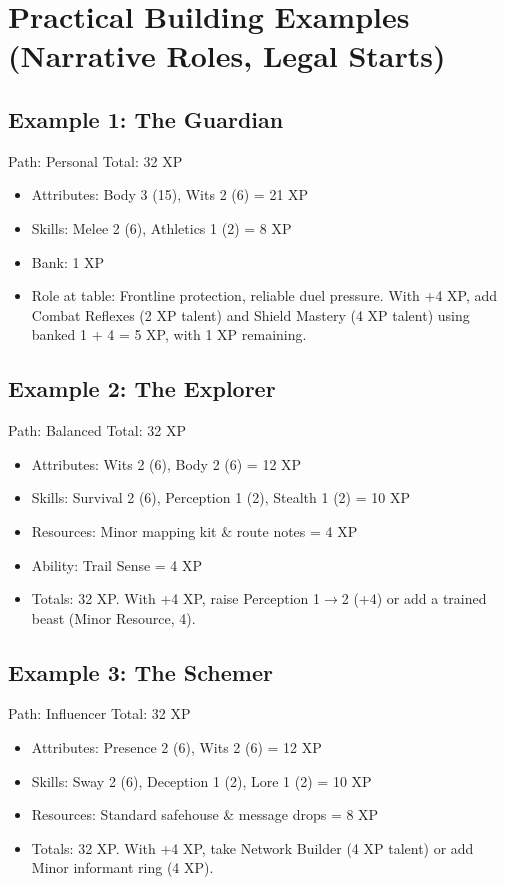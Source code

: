 \documentclass[11pt,twoside,openany]{book}
\begin{document}
\section*{Practical Building Examples (Narrative Roles, Legal Starts)} 

\subsection*{Example 1: The Guardian}

Path: Personal \hfill Total: 32 XP

\begin{itemize}
\item Attributes: Body 3 (15), Wits 2 (6) = 21 XP
\item Skills: Melee 2 (6), Athletics 1 (2) = 8 XP
\item Bank: 1 XP
\item Role at table: Frontline protection, reliable duel pressure. With +4 XP, add Combat Reflexes (2 XP talent) and Shield Mastery (4 XP talent) using banked 1 + 4 = 5 XP, with 1 XP remaining.
\end{itemize}

\subsection*{Example 2: The Explorer}

Path: Balanced \hfill Total: 32 XP

\begin{itemize}
\item Attributes: Wits 2 (6), Body 2 (6) = 12 XP
\item Skills: Survival 2 (6), Perception 1 (2), Stealth 1 (2) = 10 XP
\item Resources: Minor mapping kit \& route notes = 4 XP
\item Ability: Trail Sense = 4 XP
\item Totals: 32 XP. With +4 XP, raise Perception 1$\rightarrow$2 (+4) or add a trained beast (Minor Resource, 4).
\end{itemize}

\subsection*{Example 3: The Schemer}

Path: Influencer \hfill Total: 32 XP

\begin{itemize}
\item Attributes: Presence 2 (6), Wits 2 (6) = 12 XP
\item Skills: Sway 2 (6), Deception 1 (2), Lore 1 (2) = 10 XP
\item Resources: Standard safehouse \& message drops = 8 XP
\item Totals: 32 XP. With +4 XP, take Network Builder (4 XP talent) or add Minor informant ring (4 XP).
\end{itemize}
\end{document}
